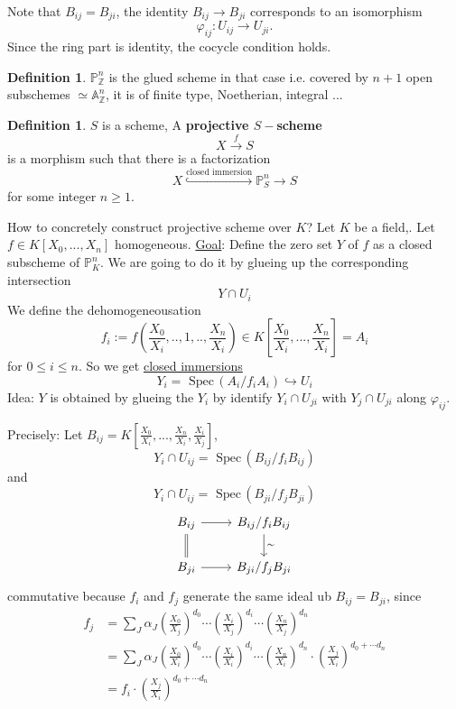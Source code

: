 \documentclass[11pt]{article}
\theoremstyle{definition}
\newtheorem{dfn}[thm]{Definition}
\newcommand{\spec}{\text{ Spec}\,}
\newcommand{\affn}{\mathbb A}
\newcommand{\proj}{\mathbb P}
\newcommand{\intg}{\mathbb Z}
\newcommand{\lrta}{\longrightarrow}
\newcommand{\inj}{\hookrightarrow}
\begin{document}
Note that $B_{ij}=B_{ji}$, the identity $B_{ij}\lrta B_{ji}$ corresponds to an isomorphism 
$$
\varphi_{ij}:U_{ij}\lrta U_{ji}.
$$
Since the ring part is identity, the cocycle condition holds.
\begin{dfn}
$\proj^n_\intg$ is the glued scheme in that case
i.e. covered by $n+1$ open subschemes $\simeq \affn^n_\intg$, it is of finite type, Noetherian, integral ...
\end{dfn}
\begin{dfn}
$S$ is a  scheme, A \textbf{projective $S-$scheme}
$$
X\overset{f}{\lrta} S
$$
is a morphism such that there is a factorization
$$
X\overset{\text{closed immersion}}\inj \proj^n_S\lrta S
$$
for some integer $n\geq 1$.
\end{dfn}

How to concretely construct projective scheme over $K$? Let $K$ be a field,. Let $f\in K[X_0,...,X_n]$ homogeneous. \underline{Goal}: Define the zero set $Y$ of $f$ as a  closed subscheme of $\proj^n_K$. We are going to do it by glueing up the corresponding intersection
$$
Y\cap U_i
$$
We define the dehomogeneousation 
$$
f_i:=f\left(\frac{X_0}{X_i},..,1,..,\frac{X_n}{X_i}\right)\in K[\frac{X_0}{X_i},...,\frac{X_n}{X_i}]=A_i
$$
for $0\leq i\leq n$.
So we get \underline{closed immersions}
$$
Y_i=\spec(A_i/f_i A_i)\inj U_i
$$
Idea: $Y$ is obtained by glueing the $Y_i$ by identify $Y_i\cap U_{ji}$ with $Y_j\cap U_{ji}$ along $\varphi_{ij}$.

Precisely: Let $B_{ij}=K[\frac{X_0}{X_i},...,\frac{X_n}{X_i},\frac{X_i}{X_j}]$,
$$
Y_i\cap U_{ij}=\spec(B_{ij}/f_i B_{ij})
$$
and
$$
Y_i\cap U_{ij}=\spec(B_{ji}/f_j B_{ji})
$$
$$
\begin{tikzcd}
B_{ij} \arrow[r] \arrow[d, equal] & B_{ij}/f_iB_{ij} \arrow[d, "\sim"] \\
B_{ji} \arrow[r] & B_{ji}/f_jB_{ji}
\end{tikzcd}
$$
commutative because $f_i$ and $f_j$ generate the same ideal ub $B_{ij}=B_{ji}$, since
$$
\begin{aligned}
f_j &=\sum_J \alpha_J \left(\frac{X_0}{X_j}\right)^{d_0}\cdots\left(\frac{X_i}{X_j}\right)^{d_i}\cdots \left(\frac{X_n}{X_j}\right)^{d_n}\\
&=\sum_J \alpha_J \left(\frac{X_0}{X_i}\right)^{d_0}\cdots\left(\frac{X_i}{X_i}\right)^{d_i}\cdots \left(\frac{X_n}{X_i}\right)^{d_n}\cdot \left(\frac{X_j}{X_i}\right)^{d_0+\cdots d_n}\\
&= f_i \cdot \left(\frac{X_j}{X_i}\right)^{d_0+\cdots d_n}
\end{aligned}
$$
\end{document}
